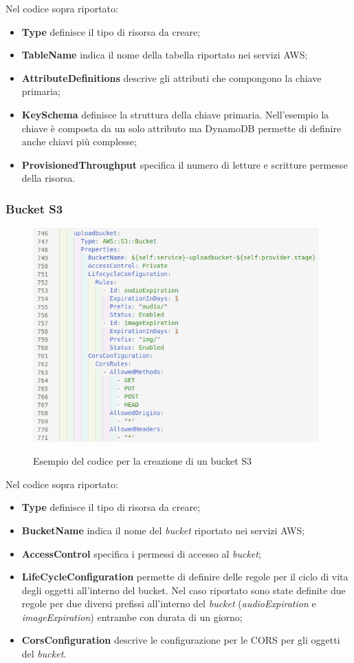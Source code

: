 		Nel codice sopra riportato:
		\begin{itemize}
			\item \textbf{Type} definisce il tipo di risorsa da creare;
			\item \textbf{TableName} indica il nome della tabella riportato nei servizi \gls{AWS};
			\item \textbf{AttributeDefinitions} descrive gli attributi che compongono la chiave primaria;
			\item \textbf{KeySchema} definisce la struttura della chiave primaria. Nell'esempio la chiave è composta da un solo attributo ma DynamoDB permette di definire anche chiavi più complesse;
			\item \textbf{ProvisionedThroughput} specifica il numero di letture e scritture permesse della risorsa.
		\end{itemize}

		\subsubsection{Bucket S3}
			
		\begin{figure}[H]
			\centering
			\includegraphics[width=11cm]{immagini/bucketS3.png} \\
			\caption{\label{fig:bucketS3} Esempio del codice per la creazione di un bucket S3}
		\end{figure}
	
		Nel codice sopra riportato:
		\begin{itemize}
			\item \textbf{Type} definisce il tipo di risorsa da creare;
			\item \textbf{BucketName} indica il nome del \emph{bucket} riportato nei servizi \gls{AWS};
			\item \textbf{AccessControl} specifica i permessi di accesso al \emph{bucket};
			\item \textbf{LifeCycleConfiguration} permette di definire delle regole per il ciclo di vita degli oggetti all'interno del bucket. Nel caso riportato sono state definite due regole per due diversi prefissi all'interno del \emph{bucket} (\emph{audioExpiration} e \emph{imageExpiration}) entrambe con durata di un giorno;
			\item \textbf{CorsConfiguration} descrive le configurazione per le \gls{CORS} per gli oggetti del \emph{bucket}.
		\end{itemize}
	
